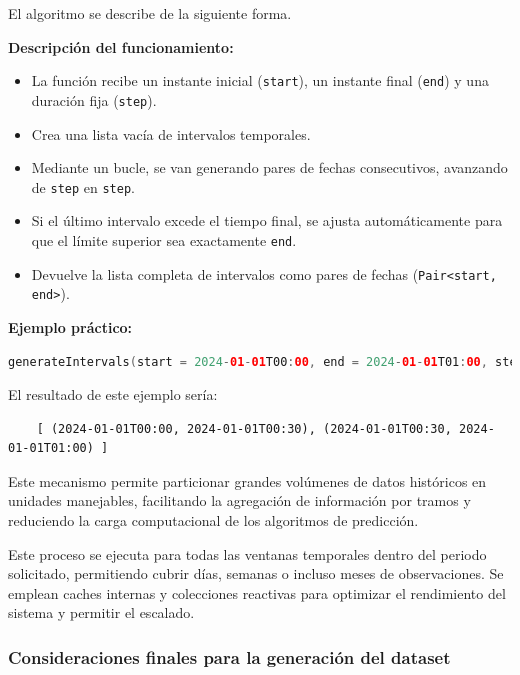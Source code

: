 El algoritmo se describe de la siguiente forma.

\vspace{1em}
\noindent \textbf{Descripción del funcionamiento:}
\begin{itemize}
	\item La función recibe un instante inicial (\texttt{start}), un instante final (\texttt{end}) y una duración fija (\texttt{step}).
	\item Crea una lista vacía de intervalos temporales.
	\item Mediante un bucle, se van generando pares de fechas consecutivos, avanzando de \texttt{step} en \texttt{step}.
	\item Si el último intervalo excede el tiempo final, se ajusta automáticamente para que el límite superior sea exactamente \texttt{end}.
	\item Devuelve la lista completa de intervalos como pares de fechas (\texttt{Pair<start, end>}).
\end{itemize}

\vspace{1em}
\noindent \textbf{Ejemplo práctico:}
\begin{lstlisting}[language=Kotlin, caption={Ejemplo de uso con intervalos de 30 minutos}]
	generateIntervals(start = 2024-01-01T00:00, end = 2024-01-01T01:00, step = Duration.ofMinutes(30))
\end{lstlisting}

\noindent El resultado de este ejemplo sería:
\begin{verbatim}
	[ (2024-01-01T00:00, 2024-01-01T00:30), (2024-01-01T00:30, 2024-01-01T01:00) ]
\end{verbatim}

Este mecanismo permite particionar grandes volúmenes de datos históricos en unidades manejables, facilitando la agregación de información por tramos y reduciendo la carga computacional de los algoritmos de predicción.

Este proceso se ejecuta para todas las ventanas temporales dentro del periodo solicitado, permitiendo cubrir días, semanas o incluso meses de observaciones. Se emplean caches internas y colecciones reactivas para optimizar el rendimiento del sistema y permitir el escalado.

\subsubsection*{Consideraciones finales para la generación del dataset}

